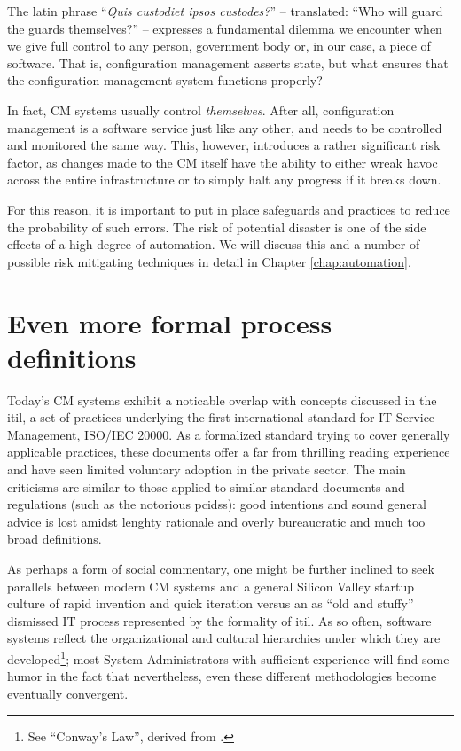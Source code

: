 The latin phrase ``{\em Quis custodiet ipsos
custodes?}'' -- translated: ``Who will guard the
guards themselves?'' -- expresses a fundamental
dilemma we encounter when we give full control to any
person, government body or, in our case, a piece of
software.  That is, configuration management asserts
state, but what ensures that the configuration
management system functions properly?

In fact, CM systems usually control {\em themselves}.
After all, configuration management is a software
service just like any other, and needs to be
controlled and monitored the same way.  This, however,
introduces a rather significant risk factor, as
changes made to the CM itself have the ability to
either wreak havoc across the entire infrastructure or
to simply halt any progress if it breaks down.

For this reason, it is important to put in place
safeguards and practices to reduce the probability of
such errors.  The risk of potential disaster is one of
the side effects of a high degree of automation.  We
will discuss this and a number of possible risk
mitigating techniques in detail in Chapter
\ref{chap:automation}.

\section{Even more formal process definitions}
\label{configuration-management:formal}

Today's CM systems exhibit a noticable overlap with
concepts discussed in the \gls{itil}\cite{configuration-management:itil}, a set of
practices underlying the first international standard
for IT Service Management, ISO/IEC 20000.  As a formalized standard trying to cover
generally applicable practices, these documents offer
a far from thrilling reading experience and have seen
limited voluntary adoption in the private sector.  The
main criticisms are similar to those applied to
similar standard documents and regulations (such as
the notorious \gls{pcidss}): good
intentions and sound general advice is lost amidst
lenghty rationale and overly bureaucratic and much too
broad definitions.

As perhaps a form of social commentary, one might be
further inclined to seek parallels between modern CM
systems and a general Silicon Valley startup culture
of rapid invention and quick iteration versus an as
``old and stuffy'' dismissed IT process represented by
the formality of \gls{itil}.  As so often, software
systems reflect the organizational and cultural
hierarchies under which they are
developed\footnote{See ``Conway's Law'', derived from
\cite{configuration-management:conways-law}.}; most System Administrators with
sufficient experience will find some humor in the fact
that nevertheless, even these different methodologies
become eventually convergent.

